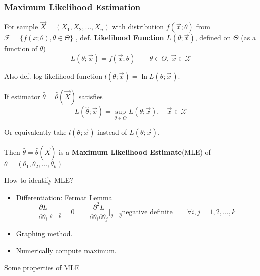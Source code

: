 \subsubsection{Maximum Likelihood Estimation}\label{SubSectionMLE}
    For sample $\vec{X}=(X_1,X_2,\ldots,X_n)$ with distribution $f(\vec{x};\theta)$ from $\mathscr{F}=\{f(x;\theta),\theta\in\Theta\}$ , def. \textbf{Likelihood Function} $L(\theta;\vec{x})$, defined on $\Theta$ (as a function of $\theta)$
    \[
        L(\theta;\vec{x})=f(\vec{x};\theta)\qquad \theta\in\Theta,\,\vec{x}\in\mathscr{X}    
    \]

    Also def. log-likelihood function $l(\theta;\vec{x})=\ln L(\theta;\vec{x})$.

    If estimator $\hat{\theta}=\hat{\theta}(\vec{X})$ satisfies
    \[
        L(\hat{\theta};\vec{x})=\sup_{\theta\in\Theta}L(\theta;\vec{x}),\quad \vec{x}\in\mathscr{X}
    \]

    Or equivalently take $l(\theta;\vec{x})$ instead of $L(\theta;\vec{x})$.

    Then $\hat{\theta}=\hat{\theta}(\vec{X})$ is a \textbf{Maximum Likelihood Estimate}(MLE) of $\theta=(\theta_1,\theta_2,\ldots,\theta_k)$

    How to identify MLE?
    \begin{itemize}
        \item Differentiation: Fermat Lemma
        \[
            \frac{\partial L}{\partial \theta_i}\bigg|_{\theta=\hat{\theta}}=0\qquad \frac{\partial^2 L}{\partial \theta_i \partial \theta_j}\bigg|_{\theta=\hat{\theta}}\text{negative definite}\qquad \forall i,j=1,2,\ldots,k
        \]
        \item Graphing method.
        \item Numerically compute maximum.
    \end{itemize}

    \begin{point}
        Some properties of MLE
    \end{point}
    
